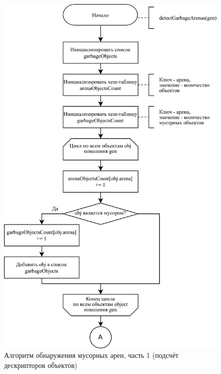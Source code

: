 \begin{figure}[H]
	\centering
	\includegraphics[scale=0.185]{assets/sweep-2.png}
	\caption{Алгоритм обнаружения мусорных арен, часть 1 (подсчёт дескрипторов объектов)}
	\label{fig:sweep-2}
\end{figure}

